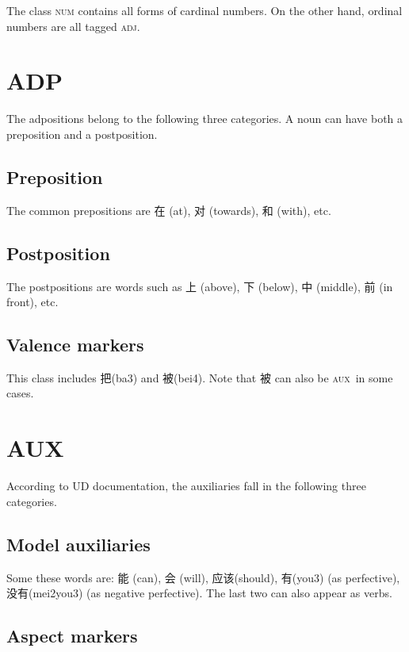 \documentclass[UTF8,oneside]{book}
\def\aux{\textsc{aux}}
\def\adj{\textsc{adj}}
\begin{document}
The class \textsc{num} contains all forms of cardinal numbers. On the other hand, ordinal numbers are all tagged \adj. 

\section{ADP}

The adpositions belong to the following three categories. A noun can have both a preposition and a postposition. 

\subsection{Preposition}

The common prepositions are 在 (at), 对 (towards), 和 (with), etc.

\subsection{Postposition}

The postpositions are words such as 上 (above), 下 (below), 中 (middle), 前 (in front), etc.

\subsection{Valence markers}

This class includes 把(ba3) and 被(bei4). Note that 被 can also be \aux\ in some cases.

\section{AUX}

According to UD documentation, the auxiliaries fall in the following three categories. 

\subsection{Model auxiliaries}

Some these words are: 能 (can), 会 (will), 应该(should), 有(you3) (as perfective), 没有(mei2you3) (as negative perfective). The last two can also appear as verbs.

\subsection{Aspect markers}
\end{document}
